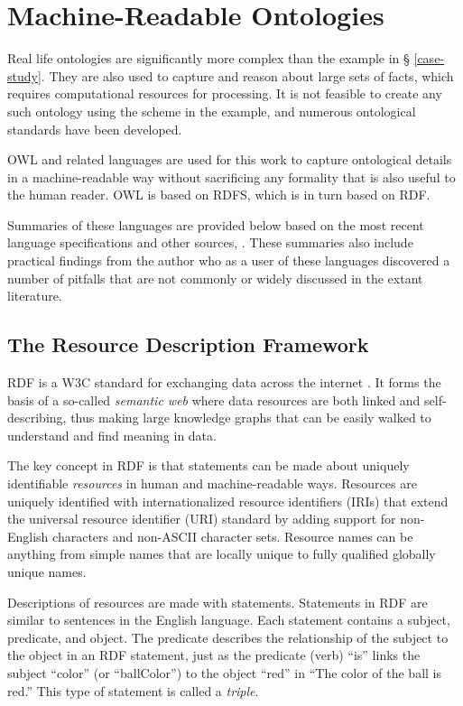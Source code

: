 \section{Machine-Readable Ontologies}

Real life ontologies are significantly more complex than the example in \S
\ref{case-study}. They are also used to capture and reason about large sets of
facts, which requires computational resources for processing. It is not feasible
to create any such ontology using the scheme in the example, and numerous
ontological standards have been developed. 

OWL and related languages are used for this work to
capture ontological details in a machine-readable way without sacrificing any
formality that is also useful to the human reader. OWL is based on RDFS, which
is in turn based on RDF.

Summaries of these languages are provided below based on the most recent
language specifications and other sources, \cite{allemang_semantic_2008}. These
summaries also include practical findings from the author who as a user of
these languages discovered a number of pitfalls that are not commonly or widely
discussed in the extant literature.

\subsection{The Resource Description Framework}

RDF is a W3C standard for exchanging data
across the internet \cite{noauthor_rdf_nodate}\cite{noauthor_rdf_nodate-3}. It
forms the basis of a so-called \textit{semantic web} where data resources are both linked and
self-describing, thus making large knowledge graphs that can be easily walked
to understand and find meaning in data.

The key concept in RDF is that statements can be made about uniquely
identifiable \textit{resources} in human and machine-readable ways. Resources
are uniquely identified with internationalized resource identifiers (IRIs) that
extend the universal resource identifier (URI) standard by adding support for
non-English characters and non-ASCII character sets. Resource names can be
anything from simple names that are locally unique to fully qualified globally
unique names.

Descriptions of resources are made with statements. Statements in RDF are
similar to sentences in the English language. Each statement contains a subject,
predicate, and object. The predicate describes the relationship of the subject
to the object in an RDF statement, just as the predicate (verb) ``is'' links the
subject ``color'' (or ``ballColor'') to the object ``red'' in ``The color of
the ball is red.'' This type of statement is called a \textit{triple}.

